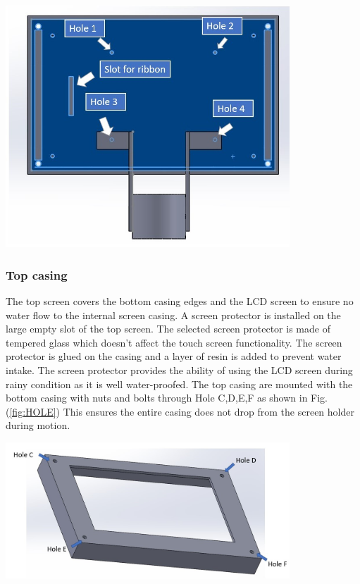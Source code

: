 \documentclass[11pt,landscape]{article}
\newenvironment{Figure}
  {\par\medskip\noindent\minipage{\linewidth}}
  {\endminipage\par\medskip}
\begin{document}
\begin{multicols}{3}
    
    \begin{Figure}
        \begin{center}
            \includegraphics[width=0.8\textwidth]{Figure11.jpg}
            \label{fig:bottom}
        \end{center}
    \end{Figure}
    

    \subsubsection{Top casing}
    The top screen covers the bottom casing edges and the LCD screen to ensure
    no water flow to the internal screen casing. A screen protector is installed
    on the large empty slot of the top screen. The selected screen protector is
    made of tempered glass which doesn’t affect the touch screen functionality.
    The screen protector is glued on the casing and a layer of resin is added to
    prevent water intake. The screen protector provides the ability of using the
    LCD screen during rainy condition as it is well water-proofed. The top
    casing are mounted with the bottom casing with nuts and bolts through Hole
    C,D,E,F as shown in Fig. (\ref{fig:HOLE}) This ensures the entire casing
    does not drop from the screen holder during motion.
    
    \begin{Figure}
        \begin{center}
            \includegraphics[width=0.8\textwidth]{Figure13.jpg}
            \label{fig:HOLE}
        \end{center}
    \end{Figure}
\end{multicols}
\end{document}
